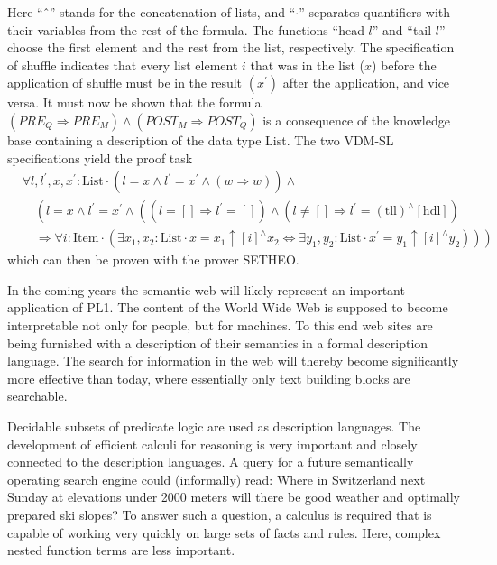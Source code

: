 \documentclass[10pt]{book}
\begin{document}
Here “ˆ” stands for the concatenation of lists, and “$\cdot$” separates quantifiers with their variables from the rest of the formula. The functions “head $l$” and “tail $l$” choose the first element and the rest from the list, respectively. The specification of shuffle indicates that every list element $i$ that was in the list ($x$) before the application of shuffle must be in the result $\left(x^{\prime}\right)$ after the application, and vice versa. It must now be shown that the formula $\left(P R E_{Q} \Rightarrow P R E_{M}\right) \wedge\left(P O S T_{M} \Rightarrow P O S T_{Q}\right)$ is a consequence of the knowledge base containing a description of the data type List. The two VDM-SL specifications yield the proof task
\[
\begin{aligned}
& \forall l, l^{\prime}, x, x^{\prime}: \text{List} \cdot \left(l=x \wedge l^{\prime}=x^{\prime} \wedge (w \Rightarrow w)\right) \wedge \\
& \quad \left(l=x \wedge l^{\prime}=x^{\prime} \wedge \left(\left(l=[] \Rightarrow l^{\prime}=[]\right) \wedge \left(l \neq [] \Rightarrow l^{\prime}=(\text{tll})^{\wedge}[\text{hdl}]\right)\right.\right. \\
& \left.\left.\quad \Rightarrow \forall i: \text{Item} \cdot \left(\exists x_{1}, x_{2}: \text{List} \cdot x=x_{1} \uparrow[i]^{\wedge} x_{2} \Leftrightarrow \exists y_{1}, y_{2}: \text{List} \cdot x^{\prime}=y_{1} \uparrow[i]^{\wedge} y_{2}\right)\right)\right)
\end{aligned}
\]
which can then be proven with the prover SETHEO.

In the coming years the semantic web will likely represent an important application of PL1. The content of the World Wide Web is supposed to become interpretable not only for people, but for machines. To this end web sites are being furnished with a description of their semantics in a formal description language. The search for information in the web will thereby become significantly more effective than today, where essentially only text building blocks are searchable.

Decidable subsets of predicate logic are used as description languages. The development of efficient calculi for reasoning is very important and closely connected to the description languages. A query for a future semantically operating search engine could (informally) read: Where in Switzerland next Sunday at elevations under 2000 meters will there be good weather and optimally prepared ski slopes? To answer such a question, a calculus is required that is capable of working very quickly on large sets of facts and rules. Here, complex nested function terms are less important.
\end{document}
